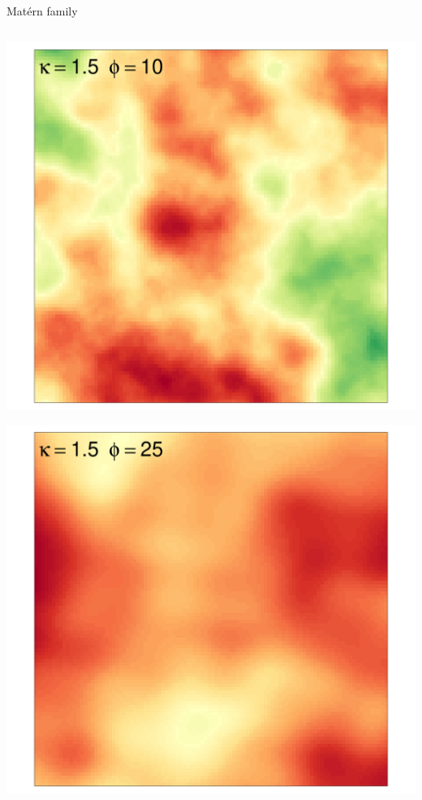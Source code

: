 \documentclass[
  ignorenonframetext,
]{beamer}
\begin{document}
\begin{frame}{Matérn family}
\begin{columns}[T]
\begin{column}{0.33\textwidth}
\includegraphics{Lecture_1_files/figure-beamer/unnamed-chunk-35-1.pdf}

\includegraphics{Lecture_1_files/figure-beamer/unnamed-chunk-36-1.pdf}
\end{column}


\end{columns}
\end{frame}
\end{document}
